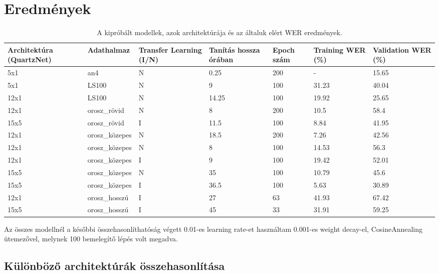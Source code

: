 \chapter{Eredmények}

\begin{table}[ht]
	\footnotesize
	\centering
	\begin{tabular}{ p{2.5cm} p{2.5cm} p{1.5cm} p{1.5cm} p{1cm} p{1.5cm} p{1.5cm} }
		\toprule
		\textbf{Architektúra (QuartzNet)} & \textbf{Adathalmaz} & \textbf {Transfer Learning (I/N)} & \textbf{Tanítás hossza órában} & \textbf{Epoch szám} & \textbf{Training WER (\%)} & \textbf{Validation WER (\%)} \\
		\midrule
		5x1 & an4 & N & 0.25 & 200 & - & 15.65 \\
		\hline
		5x1 & LS100 & N & 9 & 100 & 31.23 & 40.04 \\
		\hline
		12x1 & LS100 & N & 14.25 & 100 & 19.92 & 25.65 \\
		\hline
		\hline
		12x1 & orosz\_rövid & N & 8 & 200 & 10.5 & 58.4 \\
		\hline
		15x5 & orosz\_rövid & I & 11.5 & 100 & 8.84 & 41.95 \\
		\hline
		12x1 & orosz\_közepes & N & 18.5 & 200 & 7.26 & 42.56 \\
		\hline
		12x1 & orosz\_közepes & N & 8 & 100 & 14.53 & 56.3 \\
		\hline
		12x1 & orosz\_közepes & I & 9 & 100 & 19.42 & 52.01 \\
		\hline
		15x5 & orosz\_közepes & N & 35 & 100 & 10.79 & 45.6 \\
		\hline
		15x5 & orosz\_közepes & I & 36.5 & 100 & 5.63 & 30.89 \\
		\hline
		12x1 & orosz\_hosszú & I & 27 & 63 & 41.93 & 67.42 \\
		\hline
		15x5 & orosz\_hosszú & I & 45 & 33 & 31.91 & 59.25 \\
		\bottomrule
	\end{tabular}
	\caption{A kipróbált modellek, azok architektúrája és az általuk elért WER eredmények.}
\end{table}

Az összes modellnél a későbbi összehasonlíthatóság végett 0.01-es learning rate-et használtam 0.001-es weight decay-el, CosineAnnealing ütemezővel, melynek 100 bemelegítő lépés volt megadva.

\section{Különböző architektúrák összehasonlítása}

